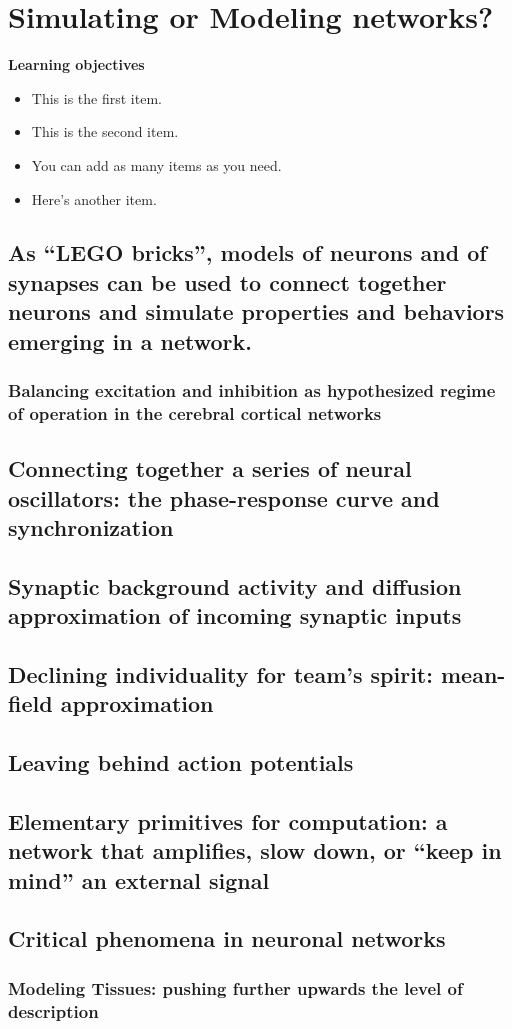 \chapter{Simulating or Modeling networks?}
\label{net} %


\vspace{2cm} %

\begin{svgraybox}
{\bf{Learning objectives}}
\begin{itemize}
	\item This is the first item.
	\item This is the second item.
	\item You can add as many items as you need.
	\item Here's another item.
  \end{itemize}
\end{svgraybox}

\clearpage


\section{As “LEGO bricks”, models of neurons and of synapses can be used to connect together neurons and simulate properties and behaviors emerging in a network.}
		\subsection{Balancing excitation and inhibition as hypothesized regime of operation in the cerebral cortical networks}
	\section{Connecting together a series of neural oscillators: the phase-response curve and synchronization}
	\section{Synaptic background activity and diffusion approximation of incoming synaptic inputs }
	\section{Declining individuality for team’s spirit: mean-field approximation}
	\section{Leaving behind action potentials }
	\section{Elementary primitives for computation: a network that amplifies, slow down, or “keep in mind” an external signal}
	\section{Critical phenomena in neuronal networks}
	\subsection{Modeling Tissues: pushing further upwards the level of description}
	
